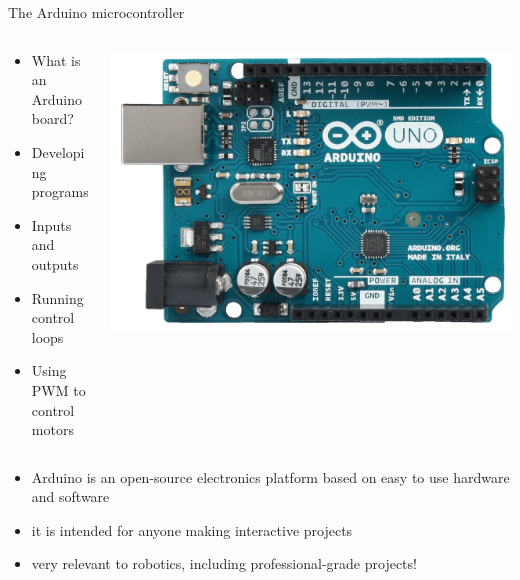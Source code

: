 \documentclass[compress]{beamer}
\begin{document}
\begin{frame}{The Arduino microcontroller}
    \begin{columns}
        \begin{column}{0.5\linewidth}
            \begin{itemize}
                \item What is an Arduino board?
                \item Developing programs
                \item Inputs and outputs
                \item Running control loops
                \item Using PWM to control motors
            \end{itemize}
        \end{column}
        \begin{column}{0.5\linewidth}
            \begin{center}
                \includegraphics[width=0.8\linewidth]{arduino-uno}
            \end{center}
        \end{column}
    \end{columns}

    \pause

    \begin{itemize}
        \item Arduino is an open-source electronics platform based on easy to
            use hardware and software
        \item it is intended for anyone making interactive projects
        \item very relevant to robotics, including professional-grade projects!
    \end{itemize}
\end{frame}
\end{document}
